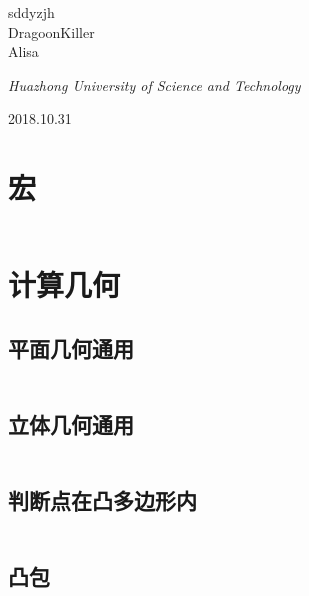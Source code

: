 \documentclass[UTF8]{ctexart}
\begin{document}
\begin{titlepage}
	{\protect sddyzjh \\ DragoonKiller \\ Alisa \\} %

	\vspace{0.5\baselineskip} %

	\textit{Huazhong University of Science and Technology} %

	\vfill %


\date{\today}

	2018.10.31 %
\end{titlepage}
\setcounter{secnumdepth}{0}

\tableofcontents

\newpage
{}

\section{宏}
\inputminted{cpp}{others/template.cpp}

\section{计算几何}

\subsection{平面几何通用}
\inputminted{cpp}{calcgeometry/平面几何通用.cpp}

\subsection{立体几何通用}
\inputminted{cpp}{calcgeometry/立体几何通用.cpp}

\subsection{判断点在凸多边形内}
\inputminted{cpp}{calcgeometry/判断点在凸多边形内.cpp}

\subsection{凸包}
\inputminted{cpp}{calcgeometry/凸包.cpp}
\end{document}

